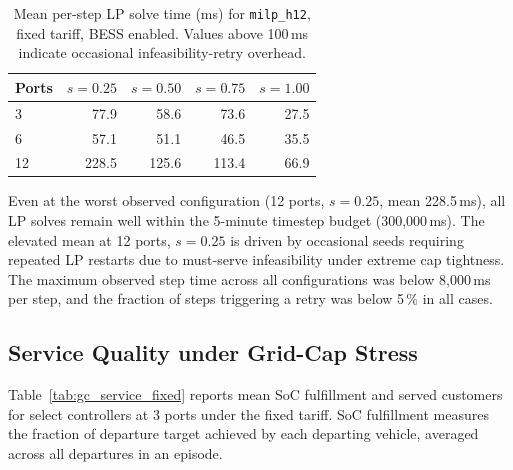\begin{table}[!htb]
\centering
\caption{Mean per-step LP solve time (ms) for \texttt{milp\_h12},
         fixed tariff, BESS enabled.  Values above 100\,ms indicate
         occasional infeasibility-retry overhead.}
\label{tab:gc_compute}
\begin{tabular}{l rrrr}
\toprule
\textbf{Ports} & $s=0.25$ & $s=0.50$ & $s=0.75$ & $s=1.00$ \\
\midrule
3  &  77.9 & 58.6 & 73.6 & 27.5 \\
6  &  57.1 & 51.1 & 46.5 & 35.5 \\
12 & 228.5 & 125.6 & 113.4 & 66.9 \\
\bottomrule
\end{tabular}
\end{table}

Even at the worst observed configuration (12 ports, $s=0.25$, mean
228.5\,ms), all LP solves remain well within the 5-minute timestep budget
(300{,}000\,ms).  The elevated mean at 12 ports, $s=0.25$ is driven by
occasional seeds requiring repeated LP restarts due to must-serve infeasibility
under extreme cap tightness.  The maximum observed step time across all
configurations was below 8{,}000\,ms per step, and the fraction of steps
triggering a retry was below 5\,\% in all cases.

\subsection{Service Quality under Grid-Cap Stress}
\label{subsec:gc_service}

Table~\ref{tab:gc_service_fixed} reports mean SoC fulfillment and served
customers for select controllers at 3 ports under the fixed tariff.  SoC
fulfillment measures the fraction of departure target achieved by each
departing vehicle, averaged across all departures in an episode.

